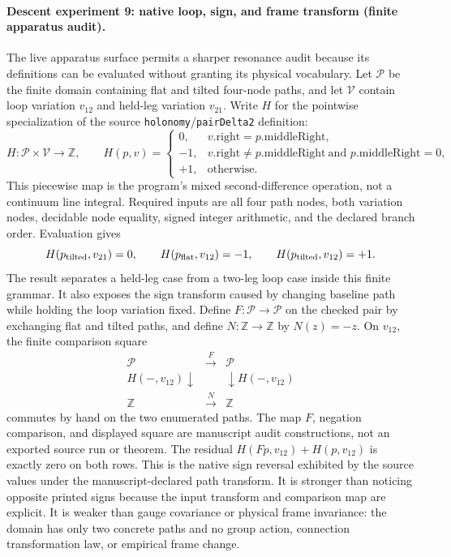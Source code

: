 \paragraph{Descent experiment 9: native loop, sign, and frame transform (finite apparatus audit).}
The live apparatus surface permits a sharper resonance audit because its definitions can be evaluated without granting
its physical vocabulary.  Let \(\mathcal P\) be the finite domain containing flat and tilted four-node paths, and let
\(\mathcal V\) contain loop variation \(v_{12}\) and held-leg variation \(v_{21}\).  Write \(H\) for the pointwise
specialization of the source \texttt{holonomy}/\texttt{pairDelta2} definition:
\[
 H:\mathcal P\times\mathcal V\longrightarrow\mathbb Z,\qquad
 H(p,v)=
 \begin{cases}
 0,&v.\mathrm{right}=p.\mathrm{middleRight},\\
 -1,&v.\mathrm{right}\ne p.\mathrm{middleRight}\ \text{and }p.\mathrm{middleRight}=0,\\
 +1,&\text{otherwise}.
 \end{cases}
\]
This piecewise map is the program's mixed second-difference operation, not a continuum line integral.  Required
inputs are all four path nodes, both variation nodes, decidable node equality, signed integer arithmetic, and the
declared branch order.  Evaluation gives
\[
 H(p_{\rm tilted},v_{21})=0,\qquad
 H(p_{\rm flat},v_{12})=-1,\qquad
 H(p_{\rm tilted},v_{12})=+1.
\]
The result separates a held-leg case from a two-leg loop case inside this finite grammar.  It also exposes the sign
transform caused by changing baseline path while holding the loop variation fixed.  Define
\(F:\mathcal P\to\mathcal P\) on the checked pair by exchanging flat and tilted paths, and define
\(N:\mathbb Z\to\mathbb Z\) by \(N(z)=-z\).  On \(v_{12}\), the finite comparison square
\[
 \begin{array}{ccc}
 \mathcal P&\xrightarrow{F}&\mathcal P\\
 H(-,v_{12})\downarrow&&\downarrow H(-,v_{12})\\
 \mathbb Z&\xrightarrow{N}&\mathbb Z
 \end{array}
\]
commutes by hand on the two enumerated paths.  The map \(F\), negation comparison, and displayed square are manuscript
audit constructions, not an exported source run or theorem.  The residual
\(H(Fp,v_{12})+H(p,v_{12})\) is exactly zero on both rows.  This is the native sign reversal exhibited by the source
values under the manuscript-declared path transform.  It is stronger than noticing opposite printed signs because the input transform and
comparison map are explicit.  It is weaker than gauge covariance or physical frame invariance: the domain has only
two concrete paths and no group action, connection transformation law, or empirical frame change.

